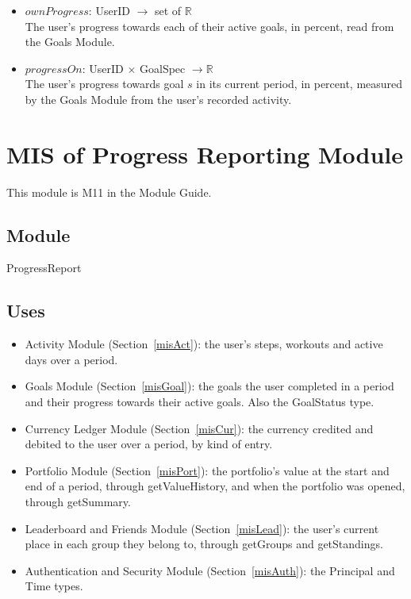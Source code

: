 \documentclass[12pt, titlepage]{article}
\begin{document}
\begin{itemize}
  $\mathit{above}(x, y) \equiv x \neq \bot \wedge (y = \bot \vee x > y)$.
  Members with equal scores share a rank, and members with no active goal
  come last.
\item $\mathit{ownProgress}$: UserID $\rightarrow$ set of $\mathbb{R}$\\
  The user's progress towards each of their active goals, in percent, read
  from the Goals Module.
\item $\mathit{progressOn}$: UserID $\times$ GoalSpec $\rightarrow
  \mathbb{R}$\\
  The user's progress towards goal $s$ in its current period, in percent,
  measured by the Goals Module from the user's recorded activity.
\end{itemize}

\section{MIS of Progress Reporting Module} \label{misProg}

This module is M11 in the Module Guide.

\subsection{Module}

ProgressReport

\subsection{Uses}

\begin{itemize}
\item Activity Module (Section~\ref{misAct}): the user's steps, workouts and
  active days over a period.
\item Goals Module (Section~\ref{misGoal}): the goals the user completed in
  a period and their progress towards their active goals. Also the
  GoalStatus type.
\item Currency Ledger Module (Section~\ref{misCur}): the currency credited
  and debited to the user over a period, by kind of entry.
\item Portfolio Module (Section~\ref{misPort}): the portfolio's value at
  the start and end of a period, through getValueHistory, and when the
  portfolio was opened, through getSummary.
\item Leaderboard and Friends Module (Section~\ref{misLead}): the user's
  current place in each group they belong to, through getGroups and
  getStandings.
\item Authentication and Security Module (Section~\ref{misAuth}): the
  Principal and Time types.
\end{itemize}
\end{document}
